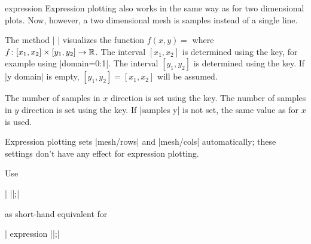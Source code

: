 \begin{addplot3operation}[]{expression }{}
\label{cmd:addplot3:expr}
	Expression plotting also works in the same way as for two dimensional plots. Now, however, a two dimensional mesh is samples instead of a single line.

	The method | | visualizes the function $f(x,y) = $ where $ f \colon [x_1,x_2] \times [y_1,y_2] \to \mathbb{R}$. The interval $[x_1,x_2]$ is determined using the  key, for example using |domain=0:1|. The interval $[y_1,y_2]$ is determined using the  key. If |y domain| is empty, $[y_1,y_2] = [x_1,x_2]$ will be assumed.

	The number of samples in $x$ direction is set using the  key. The number of samples in $y$ direction is set using the  key. If |samples y| is not set, the same value as for $x$ is used.

\pgfplotsexpensiveexample
\begin{codeexample}[]
\end{codeexample}

\pgfplotsexpensiveexample
\begin{codeexample}[]
\end{codeexample}

	Expression plotting sets |mesh/rows| and |mesh/cols| automatically; these settings don't have any effect for expression plotting.
\end{addplot3operation}

\begin{addplot3operation}[]{}{}
	Use

	| ||;|

	as short-hand equivalent for

	| expression ||;|
\end{addplot3operation}

